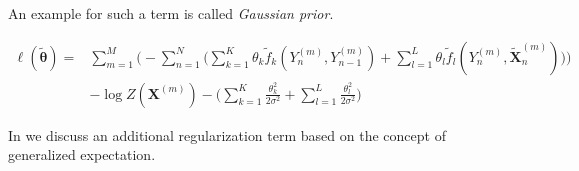 An example for such a term is called \textit{Gaussian prior}.

\begin{equation}
  \label{equ:log-likelihood-linear-chain-crf-log-linear-gaussian}
  \begin{split}
    \ell(\bm{\tilde{\theta}}) = & \sum_{m=1}^M \bigg(-\sum_{n=1}^N \Big(\sum_{k=1}^K\theta_k \tilde{f}_k(Y_n^{(m)},Y_{n-1}^{(m)})+\sum_{l=1}^L\theta_l \tilde{f}_l(Y_n^{(m)},\bm{\tilde{X}}_n^{(m)})\Big)\bigg) \\
    & -\log Z(\bm{X}^{(m)})-\Big(\sum_{k=1}^K\frac{\theta_k^2}{2\sigma^2}+\sum_{l=1}^L\frac{\theta_l^2}{2\sigma^2}\Big)
 \end{split}
\end{equation}

\bigskip

In  we discuss an additional regularization term based on the concept of \gls{generalized expectation}.

\bigskip


